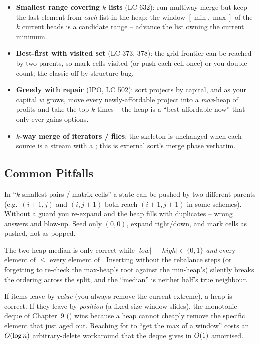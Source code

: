 \begin{itemize}[nosep]
  \item \textbf{Smallest range covering $k$ lists} (LC 632): run multiway merge but keep the last element
        from \emph{each} list in the heap; the window $[\min,\max]$ of the $k$ current heads is a candidate
        range -- advance the list owning the current minimum. \hfill{}
  \item \textbf{Best-first with visited set} (LC 373, 378): the grid frontier can be reached by two parents,
        so mark cells visited (or push each cell once) or you double-count; the classic off-by-structure bug. \hfill{}--
  \item \textbf{Greedy with repair} (IPO, LC 502): sort projects by capital, and as your capital $w$ grows,
        move every newly-affordable project into a \emph{max}-heap of profits and take the top $k$ times --
        the heap is a ``best affordable now'' that only ever gains options. \hfill{}
  \item \textbf{$k$-way merge of iterators / files}: the  skeleton is unchanged when
        each source is a stream with a ; this is external sort's merge phase verbatim. \hfill{}
\end{itemize}

\subsection{Common Pitfalls}

\begin{warningbox}
In ``$k$ smallest pairs / matrix cells'' a state can be pushed by two different parents (e.g.\ $(i{+}1,j)$ and
$(i,j{+}1)$ both reach $(i{+}1,j{+}1)$ in some schemes). Without a  guard you re-expand and the
heap fills with duplicates -- wrong answers and blow-up. Seed only $(0,0)$, expand right/down, and mark cells
as pushed, not as popped.
\end{warningbox}
\begin{warningbox}
The two-heap median is only correct while $|\mathit{low}| - |\mathit{high}| \in \{0,1\}$ \emph{and} every
element of  $\le$ every element of . Inserting without the rebalance steps (or forgetting
to re-check the max-heap's root against the min-heap's) silently breaks the ordering across the split, and
the ``median'' is neither half's true neighbour.
\end{warningbox}
\begin{warningbox}
If items leave by \emph{value} (you always remove the current extreme), a heap is correct. If they leave by
\emph{position} (a fixed-size window slides), the monotonic deque of Chapter~9 () wins because a
heap cannot cheaply remove the specific element that just aged out. Reaching for  to
``get the max of a window'' costs an $O(\log n)$ arbitrary-delete workaround that the deque gives in
$O(1)$ amortised.
\end{warningbox}

